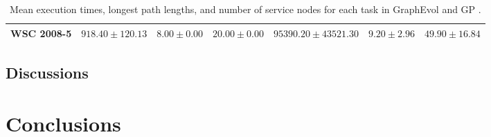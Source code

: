\documentclass{article}
\begin{document}
\begin{table}
{\begin{tabular}{c|c|c|c|c|c|c|}
\multicolumn{1}{|c|}{WSC 2008-5}    & $918.40 \pm 120.13$     & $8.00 \pm 0.00$       & $20.00 \pm 0.00$                                   & $95390.20 \pm 43521.30$                      & $9.20 \pm 2.96$       & $49.90 \pm 16.84$             \\ \hline
\end{tabular}}
\caption{Mean execution times, longest path lengths, and number of service nodes for each task in GraphEvol and GP \protect\cite{rodriguez2010composition}.}
\label{resultsTable}
\end{table}

\subsection{Discussions}

\section{Conclusions}\label{conclusions}

\clearpage


\end{document}
